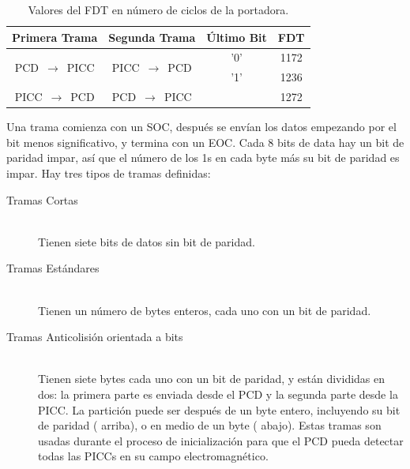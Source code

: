 \documentclass[a4paper, twoside, 11pt]{report}
\begin{document}
\begin{table}[htb]
  \centering
  \begin{tabular}{|c|c|c|c|}
    \hline
    \textbf{Primera Trama} & \textbf{Segunda Trama} & \textbf{Último Bit} & \textbf{FDT} \\
    \hline
    \multirow{2}{*}{PCD~$\rightarrow$~PICC} & \multirow{2}{*}{PICC~$\rightarrow$~PCD} & '0' & 1172  \\
    \cline{3-4}
    & & '1' & 1236 \\
    \hline
    PICC~$\rightarrow$~PCD & PCD~$\rightarrow$~PICC & & 1272 \\
    \hline
  \end{tabular}
  \caption{Valores del FDT en número de ciclos de la portadora.}
  \label{tab:fdt}
\end{table}

Una trama comienza con un SOC, después se envían los datos empezando por el bit menos significativo, y termina con un EOC. Cada 8 bits de data hay un bit de paridad impar, así que el número de los 1s en cada byte más su bit de paridad es impar. Hay tres tipos de tramas definidas:

\begin{description}
  \item [Tramas Cortas] \hfill \\ Tienen siete bits de datos sin bit de paridad.
  \item[Tramas Estándares] \hfill \\ Tienen un número de bytes enteros, cada uno con un bit de paridad.
  \item[Tramas Anticolisión orientada a bits] \hfill \\ Tienen siete bytes cada uno con un bit de paridad, y están divididas en dos: la primera parte es enviada desde el PCD y la segunda parte desde la PICC. La partición puede ser después de un byte entero, incluyendo su bit de paridad ( arriba), o en medio de un byte ( abajo). Estas tramas son usadas durante el proceso de inicialización para que el PCD pueda detectar todas las PICCs en su campo electromagnético.
\end{description}
\end{document}
